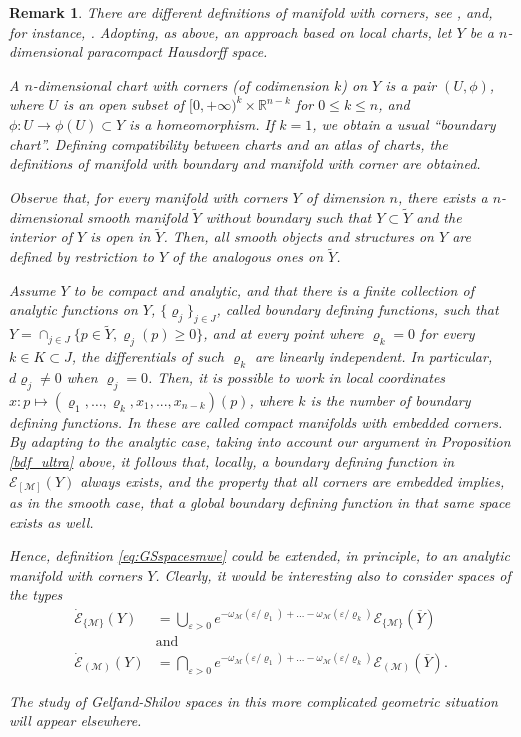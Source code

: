 \documentclass[11pt,reqno]{amsart}
\numberwithin{equation}{section}
\newtheorem{remark}[theorem]{Remark}
\newcommand{\R}{{\mathbb{R}}} %
\newcommand{\E}{{\mathcal{E}}}
\newcommand{\M}{{\mathcal{M}}} %
\begin{document}
%
\begin{remark}
	There are different definitions of manifold with corners, see \cite{Melrose_AMwC}, and, for instance, \cite{Joyce,M-RO92}.
	Adopting, as above, an approach based on local charts, let $Y$ be a $n$-dimensional paracompact Hausdorff space. 
	
A $n$-dimensional chart with corners (of codimension $k$) on $Y$ is a pair $(U,\phi)$, where $U$ is an open subset of $[0,+\infty)^k \times \R^{n-k}$ 
for $0 \le k \le n$, and $\phi\colon  U \to \phi(U) \subset Y$ is a homeomorphism. If $k = 1$, we obtain a usual ``boundary chart''. 
Defining compatibility between charts and an atlas of charts, the definitions of manifold with boundary and manifold with corner are obtained.

Observe that, for every manifold with corners $Y$ of dimension $n$, there exists a $n$-dimensional smooth manifold $\widetilde{Y}$ without boundary 
such that $Y\subset \widetilde{Y}$ and the interior of $Y$ is open in $\widetilde{Y}$. Then, all smooth objects and structures on $Y$ are defined by restriction
to $Y$ of the analogous ones on $\widetilde{Y}$.

Assume $Y$ to be compact and analytic, and that there is a finite collection of analytic functions on $Y$, $\{\varrho_j\}_{j\in J}$, called boundary defining functions,
such that $Y=\cap_{j\in J}\{p\in\widetilde{Y},\varrho_j(p)\ge0\}$, and at every point where $\varrho_k =0$ for every $k\in K\subset J$,
the differentials of such $\varrho_k$ are linearly independent. In particular, $d\varrho_j\not= 0$ when $\varrho_j = 0$. 
Then, it is possible to work in local coordinates $x \colon p \mapsto (\varrho_1,\dots,\varrho_k,x_1,...,x_{n-k})(p)$, where $k$ is the number of boundary defining functions.
In \cite[Remark 2.11]{Joyce} these are called compact manifolds with embedded corners. By adapting \cite[Proposition 2.15]{Joyce} to the analytic case, 
taking into account our argument in Proposition \ref{bdf_ultra} above, it follows that, locally, a boundary defining function in $\mathcal{E}_{[\mathcal{M}]}(Y)$ 
always exists, and the property that all corners are embedded implies, as in the smooth case, that a global boundary defining function in that same space 
exists as well.

Hence, definition \eqref{eq:GSspacesmwe} could be extended, in principle, to an analytic manifold with corners $Y$. Clearly, it would be interesting
also to consider spaces of the types
%
\begin{align*}
\dot{\E}_{\{\M\}}(Y) &= \bigcup_{\varepsilon>0}e^{-\omega_\M(\varepsilon /\varrho_1)+\dots-\omega_\M(\varepsilon /\varrho_k)}\E_{\{\M\}}(\overline{Y}) 
\\
&\text{and}
\\
\dot{\E}_{(\M)}(Y) &= \bigcap_{\varepsilon>0}e^{-\omega_\M(\varepsilon /\varrho_1)+\dots-\omega_\M(\varepsilon /\varrho_k)}\E_{(\M)}(\overline{Y}).
\end{align*}

The study of Gelfand-Shilov spaces in this more complicated geometric situation will appear elsewhere.
%
\end{remark}
\end{document}
